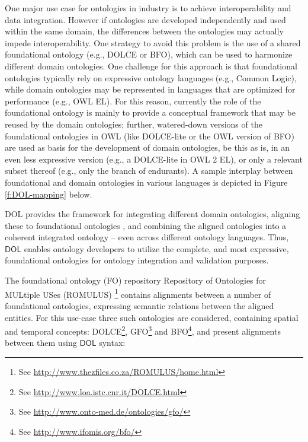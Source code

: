 \documentclass[10pt, a4paper]{isov2}
\newcommand*{\DOL}{\ensuremath{\mathsf{DOL}}\xspace}
\begin{document}
\label{onto-2}
One major use case for ontologies in industry is to achieve interoperability and data integration. 
However if ontologies are developed independently and used  within the same domain, the 
differences between the ontologies may actually impede interoperability. One strategy to avoid this 
problem is the use of a shared  foundational ontology (e.g., DOLCE or BFO), which can be used to 
harmonize different domain ontologies. One challenge for this approach is that foundational 
ontologies typically rely on expressive ontology languages (e.g., Common Logic), while domain 
ontologies may be represented in languages that are optimized for performance (e.g., OWL EL). For 
this reason, currently the role of the foundational ontology is mainly to provide a conceptual 
framework that may be reused by the  domain ontologies; further, watered-down versions of the 
foundational ontologies in OWL (like DOLCE-lite or the OWL version of BFO) are used as basis for 
the  development of domain ontologies, be this as is, in an even less expressive version (e.g., a 
DOLCE-lite in OWL 2 EL), or only a relevant subset thereof (e.g., only the branch of endurants). A 
sample interplay between  foundational and domain ontologies in various 
languages is depicted in Figure \ref{f:DOL-mapping} below.

DOL  provides the framework for integrating different domain ontologies, aligning these to 
foundational ontologies \cite{DBLP:books/daglib/0032976},\cite{AlignmentAPI} and combining the aligned ontologies into a coherent 
integrated ontology -- even across different ontology languages. Thus, \DOL  enables ontology 
developers to utilize the complete, and most expressive, foundational ontologies for ontology 
integration and validation purposes. 

The foundational ontology (FO) repository Repository of Ontologies for MULtiple USes (ROMULUS) \footnote{See \url{http://www.thezfiles.co.za/ROMULUS/home.html}}
contains alignments between a number of foundational ontologies, expressing semantic relations between the aligned
entities.  For this use-case three such ontologies are considered, containing spatial and temporal concepts: DOLCE\footnote{See \url{http://www.loa.istc.cnr.it/DOLCE.html}}, GFO\footnote{See \url{http://www.onto-med.de/ontologies/gfo/}} and BFO\footnote{See \url{http://www.ifomis.org/bfo/}}, and present alignments between them 
using \DOL syntax:
\end{document}
